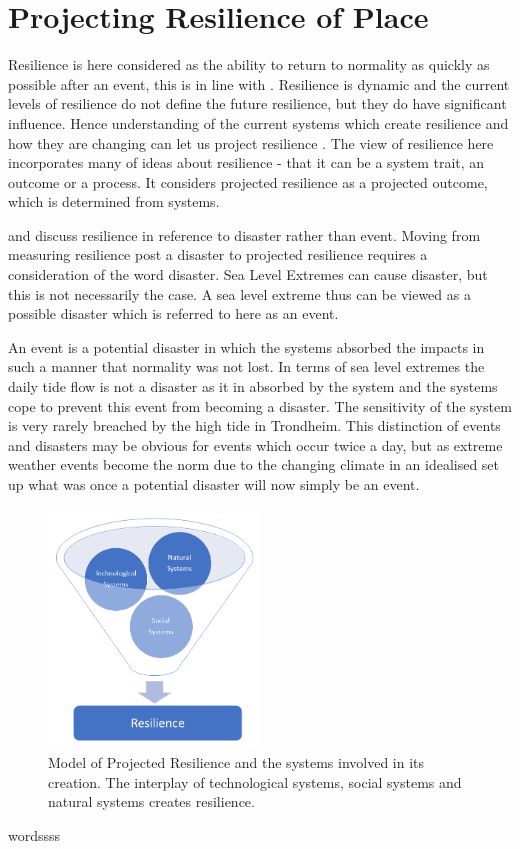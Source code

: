 \section{Projecting Resilience of Place} 
Resilience is here considered as the ability to return to normality as quickly as possible after an event, this is in line with \cite{cutter_place-based_2008}. Resilience is dynamic and the current levels of resilience do not define the future resilience, but they do have significant influence. Hence understanding of the current systems which create resilience and how they are changing can let us project resilience \cite{cutter_community_2020}. The view of resilience here incorporates many of \cite{moser_turbulent_2019} ideas about resilience -  that it can be a system trait, an outcome or a process. It considers projected resilience as a projected outcome, which is determined from systems. 

\cite{cutter_place-based_2008} and \cite{cutter_community_2020} discuss resilience in reference to disaster rather than event. Moving from measuring resilience post a disaster to projected resilience requires a consideration of the word disaster. Sea Level Extremes can cause disaster, but this is not necessarily the case. A sea level extreme thus can be viewed as a possible disaster which is referred to here as an event. 

An event is a potential disaster in which the systems absorbed the impacts in such a manner that normality was not lost. In terms of sea level extremes the daily tide flow is not a disaster as it in absorbed by the system and the systems cope to prevent this event from becoming a disaster. The sensitivity of the system is very rarely breached by the high tide in Trondheim. This distinction of events and disasters may be obvious for events which occur twice a day, but as extreme weather events become the norm due to the changing climate in an idealised set up what was once a potential disaster will now simply be an event. 

\begin{figure}[h!]
    \centering
    \includegraphics[width=0.5\textwidth]{fig_theory/resilience model .png}
    \caption{Model of Projected Resilience and the systems involved in its creation. The interplay of technological systems, social systems and natural systems creates resilience. }
    \label{fig:projected_resilience}
\end{figure}
wordssss

